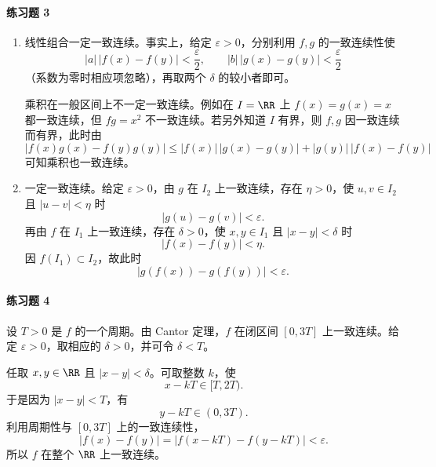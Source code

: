 \paragraph{练习题 3}
\begin{xsolution}
\begin{enumerate}[label=(\arabic*)]
 \item 线性组合一定一致连续。事实上，给定 $\varepsilon>0$，分别利用 $f,g$ 的一致连续性使
 \[
  |a|\,|f(x)-f(y)|<\frac\varepsilon2,
  \qquad
  |b|\,|g(x)-g(y)|<\frac\varepsilon2
 \]
 （系数为零时相应项忽略），再取两个 $\delta$ 的较小者即可。

 乘积在一般区间上不一定一致连续。例如在 $I=\RR$ 上 $f(x)=g(x)=x$ 都一致连续，但 $fg=x^2$ 不一致连续。若另外知道 $I$ 有界，则 $f,g$ 因一致连续而有界，此时由
 \[
  |f(x)g(x)-f(y)g(y)|
  \le |f(x)|\,|g(x)-g(y)|+|g(y)|\,|f(x)-f(y)|
 \]
 可知乘积也一致连续。

 \item 一定一致连续。给定 $\varepsilon>0$，由 $g$ 在 $I_2$ 上一致连续，存在 $\eta>0$，使 $u,v\in I_2$ 且 $|u-v|<\eta$ 时
 \[
  |g(u)-g(v)|<\varepsilon.
 \]
 再由 $f$ 在 $I_1$ 上一致连续，存在 $\delta>0$，使 $x,y\in I_1$ 且 $|x-y|<\delta$ 时
 \[
  |f(x)-f(y)|<\eta.
 \]
 因 $f(I_1)\subset I_2$，故此时
 \[
  |g(f(x))-g(f(y))|<\varepsilon.
 \]
\end{enumerate}
\end{xsolution}

\paragraph{练习题 4}
\begin{xsolution}
设 $T>0$ 是 $f$ 的一个周期。由 Cantor 定理，$f$ 在闭区间 $[0,3T]$ 上一致连续。给定 $\varepsilon>0$，取相应的 $\delta>0$，并可令 $\delta<T$。

任取 $x,y\in\RR$ 且 $|x-y|<\delta$。可取整数 $k$，使
\[
 x-kT\in[T,2T).
\]
于是因为 $|x-y|<T$，有
\[
 y-kT\in(0,3T).
\]
利用周期性与 $[0,3T]$ 上的一致连续性，
\[
 |f(x)-f(y)|
 =|f(x-kT)-f(y-kT)|<\varepsilon.
\]
所以 $f$ 在整个 $\RR$ 上一致连续。
\end{xsolution}

